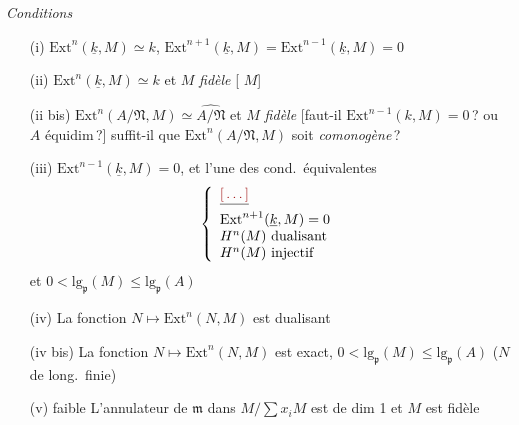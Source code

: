 \documentclass[11pt,a4paper]{article}
\begin{document}
\emph{Conditions}
\begin{enumerate}
  \item[(i)] $\mathrm{Ext}^n(\underline{k}, M) \simeq k$,
    $\mathrm{Ext}^{n+1}(\underline{k}, M) = \mathrm{Ext}^{n-1}(\underline{k}, M)
    = 0$
  \item[(ii)] $\mathrm{Ext}^n(\underline{k}, M) \simeq k$ et $M$
    \emph{fidèle} [\ill{} \ill{} \ill{} $M$]
  \item[\struck{(iii)}] 
  \item[\struck{(i bis)}] 
  \item[\struck{(iv)}] 
  \item[(ii bis)] $\mathrm{Ext}^n(A/\mathfrak{N}, M) \simeq
    \widehat{A/\mathfrak{N}}$ et $M$ \emph{fidèle} [faut-il
    $\mathrm{Ext}^{n-1}(k, M) = 0$\,? ou $A$ équidim\,?]
    suffit-il que $\mathrm{Ext}^n(A/\mathfrak{N}, M)$ soit
    \emph{comonogène}\,?
  \item[(iii)] $\mathrm{Ext}^{n-1}(\underline{k}, M) = 0$, et l'une des
    cond.\ équivalentes
    \[
      \left\{\begin{array}{l}
        \struck{\ill{}} \\
        \mathrm{Ext}^{n+1}(\underline{k}, M) = 0 \\
        H^n(M) \ \text{dualisant} \\
        H^n(M) \ \text{injectif}
      \end{array}\right.
    \]
    et $0 < \mathrm{lg}_{\mathfrak{p}}(M) \leq \mathrm{lg}_{\mathfrak{p}}(A)$
  \item[(iv)] La fonction $N \mapsto \mathrm{Ext}^n(N, M)$ est
    dualisant
  \item[(iv bis)] La fonction $N \mapsto \mathrm{Ext}^n(N, M)$ est exact,
    $0 < \mathrm{lg}_{\mathfrak{p}}(M) \leq \mathrm{lg}_{\mathfrak{p}}(A)$
    ($N$ de long.\ finie)
  \item[(v)] faible L'annulateur de $\mathfrak{m}$ dans
    $M/\sum x_i M$ est de dim 1 et $M$ est fidèle
\end{enumerate}
\end{document}
